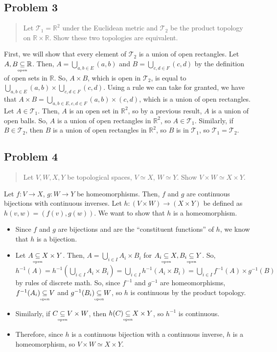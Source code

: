 \documentclass[8pt]{extarticle}
\newcommand{\open}{\underset{\clap{\tiny open}}{\subseteq}}
\begin{document}
{\subsection*{Problem 3}%

\begin{quote}
	Let $\mathcal{T}_1 = \mathbb{R}^2$ under the Euclidean metric and $\mathcal{T}_2$ be the product topology on $\mathbb{R}\times \mathbb{R}$. Show these two topologies are equivalent.
\end{quote}
First, we will show that every element of $\mathcal{T}_{2}$ is a union of open rectangles. Let $A,B\open \mathbb{R}$. Then, $A = \bigcup_{a,b\in E}(a,b)$ and $B = \bigcup_{c,d\in F}(c,d)$ by the definition of open sets in $\mathbb{R}$. So, $A\times B$, which is open in $\mathcal{T}_2$, is equal to $\bigcup_{a,b\in E}(a,b) \times \bigcup_{c,d\in F}(c,d)$. Using a rule we can take for granted, we have that $A\times B = \bigcup_{a,b\in E, c,d\in F}(a,b)\times(c,d)$, which is a union of open rectangles. \newline
\newline
Let $A\in \mathcal{T}_{1}$. Then, $A$ is an open set in $\mathbb{R}^2$, so by a previous result, $A$ is a union of open balls. So, $A$ is a union of open rectangles in $\mathbb{R}^2$, so $A\in \mathcal{T}_1$. Similarly, if $B\in \mathcal{T}_2$, then $B$ is a union of open rectangles in $\mathbb{R}^2$, so $B$ is in $\mathcal{T}_{1}$, so $\mathcal{T}_1 = \mathcal{T}_2$.
\subsection*{Problem 4}%

\begin{quote}
	Let $V,W,X,Y$ be topological spaces, $V\simeq X$, $W\simeq Y$. Show $V\times W \simeq X\times Y$.
\end{quote}
Let $f:V\rightarrow X$, $g:W\rightarrow Y$ be homeomorphisms. Then, $f$ and $g$ are continuous bijections with continuous inverses. Let $h:(V\times W) \rightarrow (X\times Y)$ be defined as $h(v,w) = (f(v),g(w))$. We want to show that $h$ is a homeomorphism.
\begin{itemize}
	\item Since $f$ and $g$ are bijections and are the ``constituent functions'' of $h$, we know that $h$ is a bijection.
	\item Let $A\open X\times Y$. Then, $A = \bigcup_{i\in I} A_{i}\times B_{i}$ for $A_{i}\open X, B_{i}\open Y$. So, $h^{-1}(A) = h^{-1}\left(\bigcup_{i\in I}A_{i}\times B_{i}\right) = \bigcup_{i\in I}h^{-1}(A_{i}\times B_{i}) = \bigcup_{i\in I}f^{-1}(A)\times g^{-1}(B)$ by rules of discrete math. So, since $f^{-1}$ and $g^{-1}$ are homeomorphisms, $f^{-1}(A_{i})\open V$ and $g^{-1}(B_{i})\open W$, so $h$ is continuous by the product topology.
	\item Similarly, if $C \open V\times W$, then $h(C) \open X\times Y$, so $h^{-1}$ is continuous.
	\item Therefore, since $h$ is a continuous bijection with a continuous inverse, $h$ is a homeomorphism, so $V\times W \simeq X\times Y$.
\end{itemize}
\pagebreak
}
\end{document}
